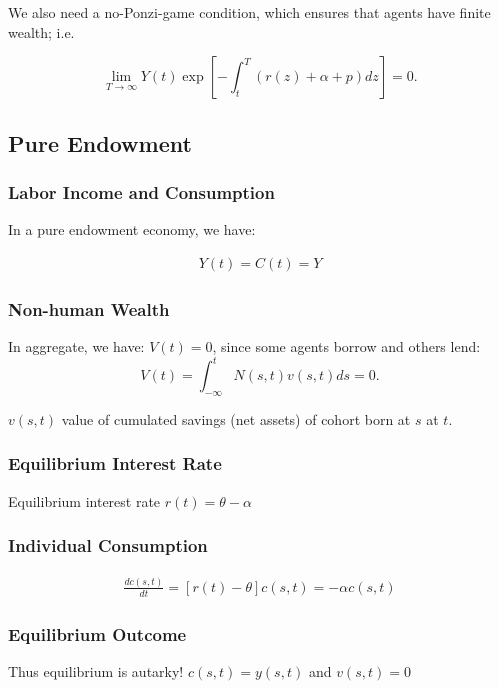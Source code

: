 \documentclass[10pt]{article}
\begin{document}
We also need a no-Ponzi-game condition, which ensures that agents have finite wealth; i.e.

$$
\lim _{T \rightarrow \infty} Y(t) \exp \left[-\int_t^T(r(z)+\alpha+p) d z\right]=0 .
$$

\subsection{Pure Endowment}

\subsubsection{Labor Income and Consumption}

In a pure endowment economy, we have:

\begin{align}
    Y(t)=C(t)=Y
\end{align}

\subsubsection{Non-human Wealth}

In aggregate, we have:
$V(t)=0$, since some agents borrow and others lend:
$$
V(t)=\int_{-\infty}^t N(s, t) v(s, t) d s=0 .
$$

$v(s, t)$ value of cumulated savings (net assets) of cohort born at $s$ at $t$.

\subsubsection{Equilibrium Interest Rate}

Equilibrium interest rate $r(t)=\theta-\alpha$

\subsubsection{Individual Consumption}

\begin{align}
    \frac{d c(s, t)}{d t}=[r(t)-\theta] c(s, t)=-\alpha c(s, t)
\end{align}

\subsubsection{Equilibrium Outcome}

Thus equilibrium is autarky! $c(s, t)=y(s, t)$ and $v(s, t)=0$
\end{document}
